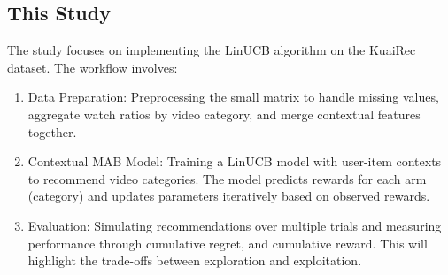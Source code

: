 




\subsection{This Study}

The study focuses on implementing the LinUCB algorithm on the KuaiRec dataset. The workflow involves:

\begin{enumerate}
    \item Data Preparation: Preprocessing the small matrix to handle missing values, aggregate watch ratios by video category, and merge contextual features together.
    \item Contextual MAB Model: Training a LinUCB model with user-item contexts to recommend video categories. The model predicts rewards for each arm (category) and updates parameters iteratively based on observed rewards.
    \item Evaluation: Simulating recommendations over multiple trials and measuring performance through cumulative regret, and cumulative reward. This will highlight the trade-offs between exploration and exploitation.
\end{enumerate}
